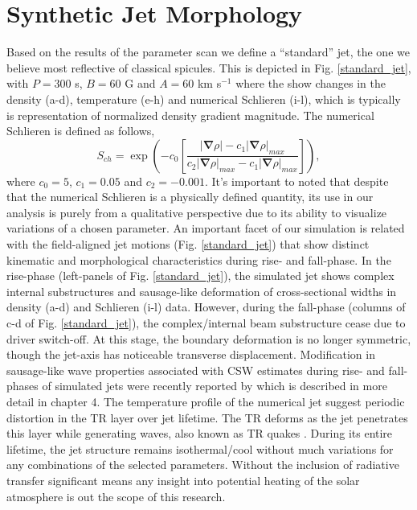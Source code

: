 \documentclass[12pt]{ociamthesis}
\newcommand{\fref}[1]{Fig. \eqref{#1}}
\newcommand{\np}{\\ \\}
\begin{document}
\section{Synthetic Jet Morphology}
Based on the results of the parameter scan we define a ``standard'' jet, the one we believe most reflective of classical spicules. This is depicted in \fref{standard_jet}, with $P=300$ s, $B=60$ G and $A=60$ km s$^{-1}$ where the show changes in the density (a-d), temperature (e-h) and numerical Schlieren (i-l), which is typically is representation of normalized density gradient magnitude. The numerical Schlieren is defined as follows,
\begin{equation}
    S_{ch} = \exp{\left( -c_0 \left[ \frac{|\boldsymbol{\nabla} \rho|-c_1 |\boldsymbol{\nabla} \rho|_{max}}{c_2 |\boldsymbol{\nabla} \rho|_{max}-c_1|\boldsymbol{\nabla} \rho|_{max}} \right] \right)}, 
\end{equation}
where $c_0=5$, $c_1=0.05$ and $c_2=-0.001$. It's important to noted that despite that the numerical Schlieren is a physically defined quantity, its use in our analysis is purely from a qualitative perspective due to its ability to visualize variations of a chosen parameter. An important facet of our simulation is related with the field-aligned jet motions (\fref{standard_jet}) that show distinct kinematic and morphological characteristics during rise- and fall-phase. In the rise-phase (left-panels of \fref{standard_jet}), the simulated jet shows complex internal substructures and sausage-like deformation of cross-sectional widths in density (a-d) and Schlieren (i-l) data. However, during the fall-phase (columns of c-d of \fref{standard_jet}), the complex/internal beam substructure cease due to driver switch-off. At this stage, the boundary deformation is no longer symmetric, though the jet-axis has noticeable transverse displacement. Modification in sausage-like wave properties associated with CSW estimates during rise- and fall-phases of simulated jets were recently reported by \citep{Mackenzie_Dover_2020} which is described in more detail in chapter 4. The temperature profile of the numerical jet suggest periodic distortion in the TR layer over jet lifetime. The TR deforms as the jet penetrates this layer while generating waves, also known as TR quakes \citep{Scullion2011ApJ74314S}. During its entire lifetime, the jet structure remains isothermal/cool without much variations for any combinations of the selected parameters. Without the inclusion of radiative transfer significant means any insight into potential heating of the solar atmosphere is out the scope of this research. \np
\end{document}
